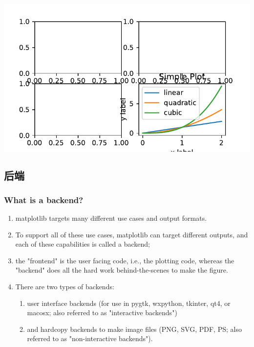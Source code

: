 \documentclass[UTF8,a4paper,12pt]{ctexart}  %
\providecommand{\tightlist}{\setlength{\itemsep}{0pt}\setlength{\parskip}{0pt}}
\begin{document}
\begin{center}\includegraphics[width=0.9\linewidth]{python-visualization_files/figure-latex/unnamed-chunk-3-1} \end{center}

\hypertarget{ux540eux7aef}{%
\subsection{后端}\label{ux540eux7aef}}

\hypertarget{what-is-a-backend}{%
\subsubsection{What is a backend?}\label{what-is-a-backend}}

\begin{enumerate}
\def\labelenumi{\arabic{enumi}.}
\tightlist
\item
  matplotlib targets many different use cases and output formats.
\item
  To support all of these use cases, matplotlib can target different
  outputs, and each of these capabilities is called a backend;
\item
  the "frontend" is the user facing code, i.e., the plotting code,
  whereas the "backend" does all the hard work behind-the-scenes to
  make the figure.
\item
  There are two types of backends:

  \begin{enumerate}
  \def\labelenumii{\arabic{enumii}.}
  \tightlist
  \item
    user interface backends (for use in pygtk, wxpython, tkinter,
    qt4, or macosx; also referred to as "interactive backends")
  \item
    and hardcopy backends to make image files (PNG, SVG, PDF, PS;
    also referred to as "non-interactive backends").
  \end{enumerate}
\end{enumerate}
\end{document}
